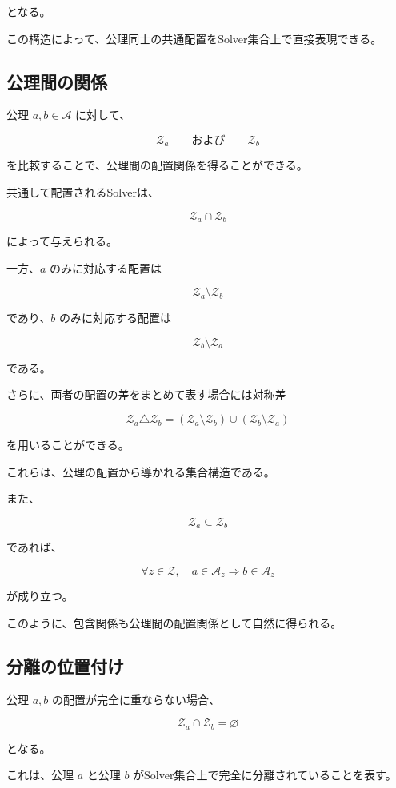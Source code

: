 となる。

この構造によって、公理同士の共通配置をSolver集合上で直接表現できる。

\subsection{公理間の関係}

公理 $a,b\in\mathcal{A}$ に対して、

\[
\mathcal{Z}_a
\qquad\text{および}\qquad
\mathcal{Z}_b
\]

を比較することで、公理間の配置関係を得ることができる。

共通して配置されるSolverは、

\[
\mathcal{Z}_a\cap\mathcal{Z}_b
\]

によって与えられる。

一方、$a$ のみに対応する配置は

\[
\mathcal{Z}_a\setminus\mathcal{Z}_b
\]

であり、$b$ のみに対応する配置は

\[
\mathcal{Z}_b\setminus\mathcal{Z}_a
\]

である。

さらに、両者の配置の差をまとめて表す場合には対称差

\[
\mathcal{Z}_a\triangle\mathcal{Z}_b = (\mathcal{Z}_a\setminus\mathcal{Z}_b)\cup(\mathcal{Z}_b\setminus\mathcal{Z}_a)
\]

を用いることができる。

これらは、公理の配置から導かれる集合構造である。

また、

\[
\mathcal{Z}_a\subseteq\mathcal{Z}_b
\]

であれば、

\[
\forall z\in\mathcal{Z},\quad
a\in\mathcal{A}_z
\Longrightarrow
b\in\mathcal{A}_z
\]

が成り立つ。

このように、包含関係も公理間の配置関係として自然に得られる。

\subsection{分離の位置付け}

公理 $a,b$ の配置が完全に重ならない場合、

\[
\mathcal{Z}_a\cap\mathcal{Z}_b = \varnothing
\]

となる。

これは、公理 $a$ と公理 $b$ がSolver集合上で完全に分離されていることを表す。

